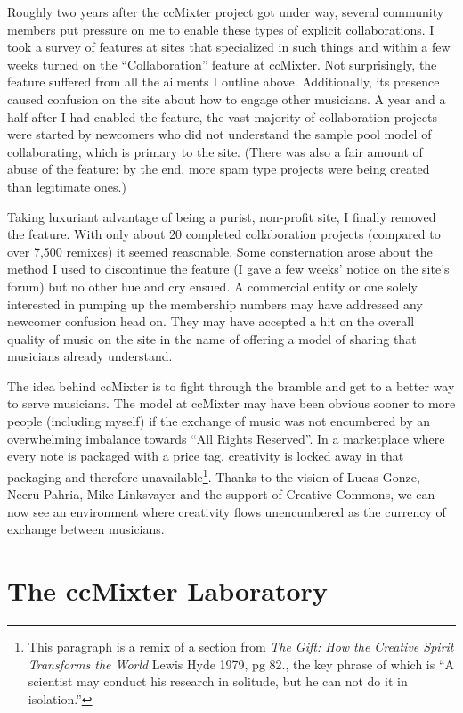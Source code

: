Roughly two years after the ccMixter project got under way, several community
members put pressure on me to enable these types of explicit collaborations. I
took a survey of features at sites that specialized in such things and within a
few weeks turned on the ``Collaboration'' feature at ccMixter. Not surprisingly,
the feature suf\hbox{}fered from all the ailments I outline above. Additionally, its
presence caused confusion on the site about how to engage other musicians. A
year and a half after I had enabled the feature, the vast majority of
collaboration projects were started by newcomers who did not understand the
sample pool model of collaborating, which is primary to the site. (There was
also a fair amount of abuse of the feature: by the end, more spam type projects
were being created than legitimate ones.)

Taking luxuriant advantage of being a purist, non-prof\hbox{}it site, I f\hbox{}inally removed
the feature. With only about 20 completed collaboration projects (compared to
over 7,500 remixes) it seemed reasonable. Some consternation arose about the
method I used to discontinue the feature (I gave a few weeks' notice on the
site's forum) but no other hue and cry ensued. A commercial entity or one solely
interested in pumping up the membership numbers may have addressed any newcomer
confusion head on. They may have accepted a hit on the overall quality of music
on the site in the name of of\hbox{}fering a model of sharing that musicians already
understand. 

The idea behind ccMixter is to f\hbox{}ight through the bramble and get to a better way
to serve musicians. The model at ccMixter may have been obvious sooner to more
people (including myself) if the exchange of music was not encumbered by an
overwhelming imbalance towards ``All Rights Reserved''. In a marketplace where
every note is packaged with a price tag, creativity is locked away in that
packaging and therefore unavailable\footnote{This paragraph is a remix of a
section from \textit{The Gift: How the Creative Spirit Transforms the World}
Lewis Hyde 1979, pg 82., the key phrase of which is ``A scientist may conduct
his research in solitude, but he can not do it in isolation.''}. Thanks to the
vision of Lucas Gonze, Neeru Pahria, Mike Linksvayer and the support of Creative
Commons, we can now see an environment where creativity f\hbox{}lows unencumbered as
the currency of exchange between musicians. 


\section{The ccMixter Laboratory}
\label{s:unexpected_collaboration:ccmixter_lab}

